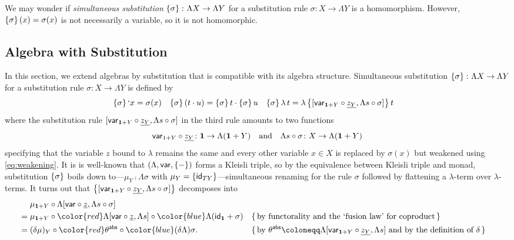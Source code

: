 \documentclass[acmsmall,review]{acmart}\settopmatter{printfolios=true,printccs=false,printacmref=false}
\theoremstyle{acmdefinition}
\begin{document}
We may wonder if \emph{simultaneous substitution} $\subst{\sigma}\colon \Lambda X \to \Lambda Y$ for a substitution rule $\sigma\colon X \to \Lambda Y$ is a homomorphism.
However, $\subst{\sigma}(x) = \sigma(x)$ is not necessarily a variable, so it is not homomorphic.
\subsection{Algebra with Substitution}\label{sec:algebra-with-substitution}
In this section, we extend algebras by substitution that is compatible with its algebra structure. 
Simultaneous substitution $\subst{\sigma}\colon \Lambda X \to \Lambda Y$ for a substitution rule $\sigma\colon X \to \Lambda Y$ is defined by
\begin{align*}
  \subst{\sigma}`x & = \sigma(x)  & \subst{\sigma}(t \cdot u) & = \subst{\sigma}t \cdot \subst{\sigma}u
                     &  \subst{\sigma}\lambda\,t & = \lambda \subst{[\mathsf{var}_{\Unit + Y} \circ \underline{z_Y}, \Lambda s \circ \sigma]}t
\end{align*}
where the substitution rule $[\mathsf{var}_{\Unit + Y} \comp \underline{z_Y}, \Lambda s \circ \sigma]$ in the third rule amounts to two functions
\[
  \mathsf{var}_{1 + Y} \circ \underline{z_Y} \colon \Unit \to \Lambda(\Unit + Y)
  \quad\text{and}\quad
  \Lambda s \circ \sigma \colon X \to \Lambda(\Unit + Y)
\]
specifying that the variable $z$ bound to $\lambda$ remains the same and every other variable $x \in X$ is replaced by $\sigma(x)$ but weakened using \eqref{eq:weakening}. 
It is is well-known \citep{Altenkirch1999a} that $(\Lambda, \mathsf{var}, \subst{\blank})$ forms a Kleisli triple, so
by the equivalence between Kleisli triple and monad, substitution $\subst{\sigma}$ boils down to---$\mu_Y \comp \Lambda \sigma$ with $\mu_Y = \subst{\idfunc[TY]}$---simultaneous renaming for the rule $\sigma$ followed by flattening a $\lambda$-term over $\lambda$-terms.
It turns out that $\subst{[\mathsf{var}_{\Unit + Y}\comp \underline{z_Y}, \Lambda s \circ \sigma]}$ decomposes into
\begin{align*}
      & \mu_{\Unit + Y} \comp \Lambda[\mathsf{var} \circ \underline{z}, \Lambda s \circ \sigma] \\
  ={} & \mu_{\Unit + Y} \comp {\color{red}\Lambda[\mathsf{var} \circ \underline{z}, \Lambda s]} \comp {\color{blue}\Lambda(\idfunc[\Unit] + \sigma)}
      && \{\,\text{by functorality and the `fusion law' for coproduct} \,\} \\
  ={} & (\delta\mu)_Y \comp {\color{red}\theta^{\mathsf{abs}}} \comp {\color{blue}(\delta\Lambda)\sigma}.
      && \{\,\text{by $\theta^{\mathsf{abs}} \defid \Lambda[\mathsf{var}_{\Unit + Y} \circ \underline{z_Y}, \Lambda s]$ and by the definition of $\delta$} \,\} 
\end{align*}
\end{document}
